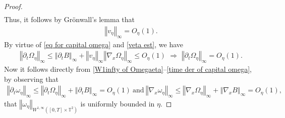 \documentclass[11pt,reqno]{amsart}
\numberwithin{equation}{section}
\begin{document}
\begin{proof}
\begin{align*}
\end{align*}
Thus, it follows by Gr\"onwall's lemma that 
\begin{align}
\left\Vert v_{\eta}\right\Vert_{\infty}=O_{\eta}(1). \label{veta est} \end{align}
By virtue of  \eqref{eq for capital omega} and \eqref{veta est}, we have
\begin{align}
\left\Vert \partial_{t}\Omega_{\eta}\right\Vert_{\infty}\leq \left\Vert \partial_{t} B\right\Vert_{\infty}+\left\Vert v_{\eta}\right\Vert_{\infty}\left\Vert \nabla_{x}\Omega_{\eta}\right\Vert_{\infty}\leq O_{\eta}(1)\,\,\Longrightarrow\,\,
\left\Vert \partial_{t}\Omega_{\eta}\right\Vert_{\infty}=O_{\eta}(1).   \label{time der of capital omega}      \end{align}
Now it follows directly from \eqref{W1infty of Omegaeta}--\eqref{time der of capital omega}, 
by observing that 
\begin{align}
\left\Vert \partial_{t}\omega_{\eta}\right\Vert_{\infty}\leq \left\Vert \partial_{t}\Omega_{\eta}\right\Vert_{\infty}+\left\Vert \partial_{t}B\right\Vert_{\infty}=O_{\eta}(1)\ \mbox{and}\ \left\Vert \nabla_{x}\omega_{\eta}\right\Vert_{\infty}\leq \left\Vert \nabla_{x}\Omega_{\eta}\right\Vert_{\infty}+\left\Vert \nabla_{x}B\right\Vert_{\infty}=O_{\eta}(1),  
\label{x der of omegaeta}        
\end{align}
that $\left\Vert \omega_{\eta} \right\Vert_{W^{1,\infty}([0,T]\times \mathbb{T}^{2})}$ 
is uniformly bounded in $\eta$. 


\end{proof}
\end{document}
